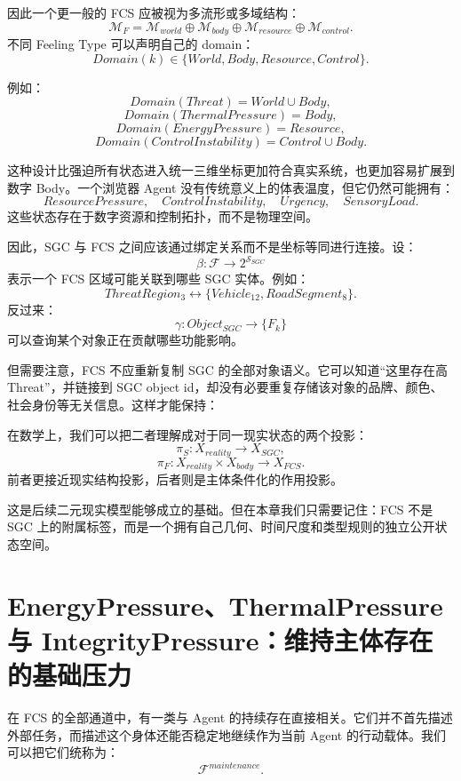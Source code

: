 因此一个更一般的 FCS 应被视为多流形或多域结构：
\[
\mathcal M_F
=
\mathcal M_{world}
\oplus
\mathcal M_{body}
\oplus
\mathcal M_{resource}
\oplus
\mathcal M_{control}.
\]
不同 Feeling Type 可以声明自己的 domain：
\[
Domain(k)
\in
\{
World,
Body,
Resource,
Control
\}.
\]

例如：
\[
Domain(Threat)=World\cup Body,
\]
\[
Domain(ThermalPressure)=Body,
\]
\[
Domain(EnergyPressure)=Resource,
\]
\[
Domain(ControlInstability)=Control\cup Body.
\]

这种设计比强迫所有状态进入统一三维坐标更加符合真实系统，也更加容易扩展到数字 Body。一个浏览器 Agent 没有传统意义上的体表温度，但它仍然可能拥有：
\[
ResourcePressure,
\quad
ControlInstability,
\quad
Urgency,
\quad
SensoryLoad.
\]
这些状态存在于数字资源和控制拓扑，而不是物理空间。

因此，SGC 与 FCS 之间应该通过绑定关系而不是坐标等同进行连接。设：
\[
\beta:
\mathcal F
\rightarrow
2^{\mathcal S_{SGC}}
\]
表示一个 FCS 区域可能关联到哪些 SGC 实体。例如：
\[
ThreatRegion_3
\leftrightarrow
\{Vehicle_{12},RoadSegment_8\}.
\]
反过来：
\[
\gamma:
Object_{SGC}
\rightarrow
\{F_k\}
\]
可以查询某个对象正在贡献哪些功能影响。

但需要注意，FCS 不应重新复制 SGC 的全部对象语义。它可以知道“这里存在高 Threat”，并链接到 SGC object id，却没有必要重复存储该对象的品牌、颜色、社会身份等无关信息。这样才能保持：
\begin{statementbox}
\centering
{}
\end{statementbox}

在数学上，我们可以把二者理解成对于同一现实状态的两个投影：
\[
\pi_S:
X_{reality}
\rightarrow
X_{SGC},
\]
\[
\pi_F:
X_{reality}\times X_{body}
\rightarrow
X_{FCS}.
\]
前者更接近现实结构投影，后者则是主体条件化的作用投影。

这是后续二元现实模型能够成立的基础。但在本章我们只需要记住：FCS 不是 SGC 上的附属标签，而是一个拥有自己几何、时间尺度和类型规则的独立公开状态空间。

\section{EnergyPressure、ThermalPressure 与 IntegrityPressure：维持主体存在的基础压力}

在 FCS 的全部通道中，有一类与 Agent 的持续存在直接相关。它们并不首先描述外部任务，而描述这个身体还能否稳定地继续作为当前 Agent 的行动载体。我们可以把它们统称为：
\[
\mathcal F^{maintenance}.
\]

